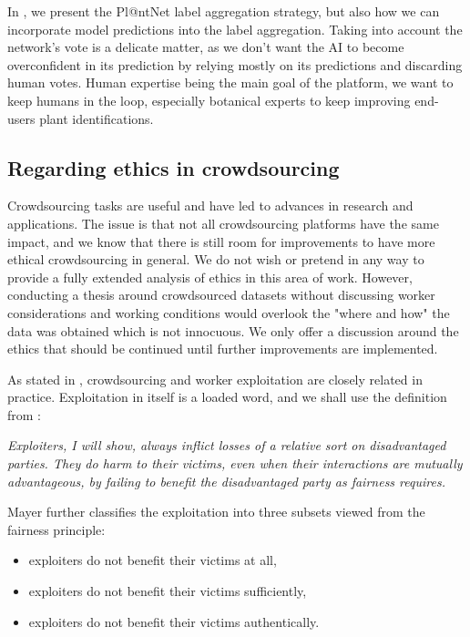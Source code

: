In , we present the Pl@ntNet label aggregation strategy, but also how we can incorporate model predictions into the label aggregation.
Taking into account the network's vote is a delicate matter, as we don't want the AI to become overconfident in its prediction by relying mostly on its predictions and discarding human votes.
Human expertise being the main goal of the platform, we want to keep humans in the loop, especially botanical experts to keep improving end-users plant identifications.

\subsection{Regarding ethics in crowdsourcing}
\label{sub:ethics}

Crowdsourcing tasks are useful and have led to advances in research and applications.
The issue is that not all crowdsourcing platforms have the same impact, and we know that there is still room for improvements to have more ethical crowdsourcing in general.
We do not wish or pretend in any way to provide a fully extended analysis of ethics in this area of work.
However, conducting a thesis around crowdsourced datasets without discussing worker considerations and working conditions would overlook the "where and how" the data was obtained which is not innocuous.
We only offer a discussion around the ethics that should be continued until further improvements are implemented.

As stated in \citet{schmidt2013good}, crowdsourcing and worker exploitation are closely related in practice.
Exploitation in itself is a loaded word, and we shall use the definition from \citet{mayerexploitation}:
\begin{center}
    \begin{minipage}{.75\textwidth}
    \emph{
    Exploiters, I will show, always inflict losses of a relative sort on disadvantaged parties. They do harm to their victims, even when their interactions are mutually advantageous, by failing to benefit the disadvantaged party as fairness requires.
    }
    \end{minipage}
\end{center}
Mayer further classifies the exploitation into three subsets viewed from the fairness principle:
\begin{itemize}
    \item exploiters do not benefit their victims at all,
    \item exploiters do not benefit their victims sufficiently,
    \item exploiters do not benefit their victims authentically.
\end{itemize}

